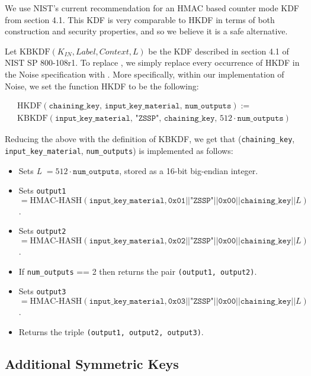 \documentclass{article}
\begin{document}
We use NIST's current recommendation for an HMAC based counter mode KDF \cite{fips_kbkdf} from section 4.1. This KDF is very comparable to HKDF in terms of both construction and security properties, and so we believe it is a safe alternative.

Let $\text{KBKDF}(\textit{K}_{\textit{IN}}, \textit{Label}, \textit{Context}, \textit{L})$ be the KDF described in section 4.1 of NIST SP 800-108r1.
To replace , we simply replace every occurrence of HKDF in the Noise specification with .
More specifically, within our implementation of Noise, we set the function HKDF to be the following:

\begin{multline*}
	\text{HKDF}(\texttt{chaining\_key},\, \texttt{input\_key\_material},\, \texttt{num\_outputs}) := \\
	\text{KBKDF}(\texttt{input\_key\_material},\, \texttt{"ZSSP"},\, \texttt{chaining\_key},\, 512 \cdot \texttt{num\_outputs})
\end{multline*}

Reducing the above with the definition of KBKDF, we get that (\texttt{chaining\_key},\\ \texttt{input\_key\_material}, \texttt{num\_outputs}) is implemented as follows:

\begin{itemize}
	\item Sets \textit{L} $= 512 \cdot \texttt{num\_outputs}$, stored as a 16-bit big-endian integer.
	\item Sets \texttt{output1} $= \text{HMAC-HASH}(\texttt{input\_key\_material}, \texttt{0x01}||\texttt{"ZSSP"}||\texttt{0x00}||\texttt{chaining\_key}||L)$.
	\item Sets \texttt{output2} $= \text{HMAC-HASH}(\texttt{input\_key\_material}, \texttt{0x02}||\texttt{"ZSSP"}||\texttt{0x00}||\texttt{chaining\_key}||L)$.
	\item If \texttt{num\_outputs} == 2 then returns the pair \texttt{(output1, output2)}.
	\item Sets \texttt{output3} $= \text{HMAC-HASH}(\texttt{input\_key\_material}, \texttt{0x03}||\texttt{"ZSSP"}||\texttt{0x00}||\texttt{chaining\_key}||L)$.
	\item Returns the triple \texttt{(output1, output2, output3)}.
\end{itemize}

\subsection{Additional Symmetric Keys}
\end{document}
